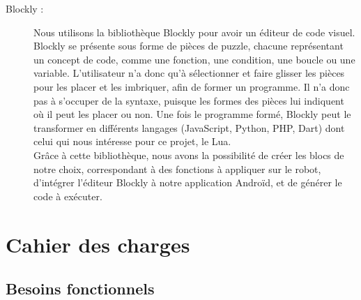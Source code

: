 \documentclass[12pt,francais]{report}
\begin{document}
\bigskip
\begin{description}
\item [Blockly :] Nous utilisons la bibliothèque Blockly \cite{ref2} pour avoir un éditeur de code visuel. Blockly se présente sous forme de pièces de puzzle, chacune représentant un concept de code, comme une fonction, une condition, une boucle ou une variable. L'utilisateur n'a donc qu'à sélectionner et faire glisser les pièces pour les placer et les  imbriquer, afin de former un programme. Il n'a donc pas à s'occuper de la syntaxe, puisque les formes des pièces lui indiquent où il peut les placer ou non. Une fois le programme formé, Blockly peut le transformer en différents langages (JavaScript, Python, PHP, Dart) dont celui qui nous intéresse pour ce projet, le Lua.\\
Grâce à cette bibliothèque, nous avons la possibilité de créer les blocs de notre choix, correspondant à des fonctions à appliquer sur le robot, d'intégrer l'éditeur Blockly à notre application Androïd, et de générer le code à exécuter.
\end{description}


\chapter*{Cahier des charges}

\section*{Besoins fonctionnels}
\end{document}
